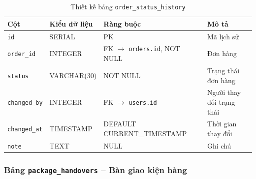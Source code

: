 \begin{table}[H]
\centering
\caption{Thiết kế bảng \texttt{order\_status\_history}}
\begin{tabularx}{\textwidth}{|l|l|Z|Z|}
\hline
\textbf{Cột} &
\textbf{Kiểu dữ liệu} &
\textbf{Ràng buộc} &
\textbf{Mô tả} \\ \hline

\texttt{id}
& SERIAL
& PK
& Mã lịch sử \\ \hline

\texttt{order\_id}
& INTEGER
& FK $\rightarrow$ \texttt{orders.id}, NOT NULL
& Đơn hàng \\ \hline

\texttt{status}
& VARCHAR(30)
& NOT NULL
& Trạng thái đơn hàng \\ \hline

\texttt{changed\_by}
& INTEGER
& FK $\rightarrow$ \texttt{users.id}
& Người thay đổi trạng thái \\ \hline

\texttt{changed\_at}
& TIMESTAMP
& DEFAULT CURRENT\_TIMESTAMP
& Thời gian thay đổi \\ \hline

\texttt{note}
& TEXT
& NULL
& Ghi chú \\ \hline

\end{tabularx}
\end{table}



\subsubsection{Bảng \texttt{package\_handovers} -- Bàn giao kiện hàng}

